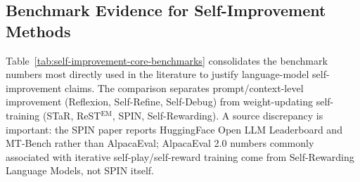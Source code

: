 
\subsection{Benchmark Evidence for Self-Improvement Methods}
\label{sec:benchmark-self-improvement}

Table~\ref{tab:self-improvement-core-benchmarks} consolidates the benchmark numbers most directly used in the literature to justify language-model self-improvement claims.  The comparison separates prompt/context-level improvement (Reflexion, Self-Refine, Self-Debug) from weight-updating self-training (STaR, ReST$^{\mathrm{EM}}$, SPIN, Self-Rewarding).  A source discrepancy is important: the SPIN paper reports HuggingFace Open LLM Leaderboard and MT-Bench rather than AlpacaEval; AlpacaEval 2.0 numbers commonly associated with iterative self-play/self-reward training come from Self-Rewarding Language Models, not SPIN itself.

